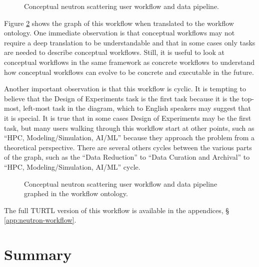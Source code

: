 \begin{figure}[htbp]
\centering
{}
\caption{Conceptual neutron scattering user workflow and data pipeline.}
\label{neutron-workflow}
\end{figure}

Figure \ref{neutron-workflow-graph} shows the graph of this workflow when
translated to the workflow ontology. One immediate observation is that
conceptual workflows may not require a deep translation to be understandable
and that in some cases only tasks are needed to describe conceptual workflows.
Still, it is useful to look at conceptual workflows in the same framework as
concrete workflows to understand how conceptual workflows can evolve to be
concrete and executable in the future.

Another important observation is that this workflow is cyclic. It is tempting to
believe that the Design of Experiments task is the first task because it is the
top-most, left-most task in the diagram, which to English speakers may suggest
that it is special. It is true that in some cases Design of Experiments may be
the first task, but many users walking through this workflow start at other
points, such as ``HPC, Modeling/Simulation, AI/ML'' because they approach
the problem from a theoretical perspective. There are several others cycles
between the various parts of the graph, such as the ``Data Reduction'' to
``Data Curation and Archival'' to ``HPC, Modeling/Simulation, AI/ML'' cycle.

\begin{figure}[htbp]
\centering
{}
\caption{Conceptual neutron scattering user workflow and data pipeline
graphed in the workflow ontology.}
\label{neutron-workflow-graph}
\end{figure}

The full TURTL version of this workflow is available in the appendices, \S
\ref{app:neutron-workflow}.

\section{Summary}
\label{workflows-ont-summary}

